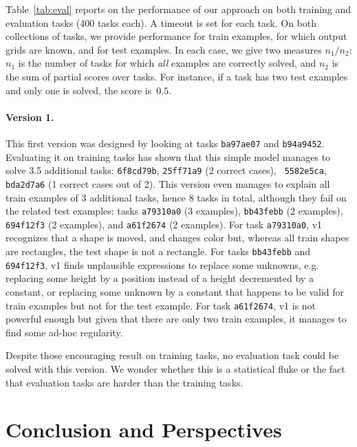 \documentclass[a4paper]{llncs}
\begin{document}
Table~\ref{tab:eval} reports on the performance of our approach on
both training and evaluation tasks (400 tasks each). A timeout is set
for each task. On both collections of tasks, we provide performance
for train examples, for which output grids are known, and for test
examples. In each case, we give two measures $n_1/n_2$: $n_1$ is the
number of tasks for which {\em all} examples are correctly solved, and
$n_2$ is the sum of partial scores over tasks. For instance, if a task
has two test examples and only one is solved, the score is~$0.5$.

\paragraph{Version 1.} This first version was designed by looking at
tasks {\tt ba97ae07} and {\tt b94a9452}. Evaluating it on training
tasks has shown that this simple model manages to solve 3.5 additional
tasks: {\tt 6f8cd79b}, {\tt 25ff71a9} (2 correct cases), {\tt
  5582e5ca}, {\tt bda2d7a6} (1 correct cases out of 2). This version
even manages to explain all train examples of 3 additional tasks,
hence 8 tasks in total, although they fail on the related test
examples: tasks {\tt a79310a0} (3 examples), {\tt bb43febb} (2
examples), {\tt 694f12f3} (2 examples), and {\tt a61f2674} (2
examples). For task {\tt a79310a0}, v1 recognizes that a shape is
moved, and changes color but, whereas all train shapes are rectangles,
the test shape is not a rectangle. For tasks {\tt bb43febb} and {\tt
  694f12f3}, v1 finds unplausible expressions to replace some
unknowns, e.g. replacing some height by a position instead of a height
decremented by a constant, or replacing some unknown by a constant
that happens to be valid for train examples but not for the test
example. For task {\tt a61f2674}, v1 is not powerful enough but given
that there are only two train examples, it manages to find some ad-hoc
regularity.

Despite those encouraging result on training tasks, no evaluation task
could be solved with this version. We wonder whether this is a
statistical fluke or the fact that evaluation tasks are harder than
the training tasks.

\section{Conclusion and Perspectives}
\label{conclu}



\end{document}
